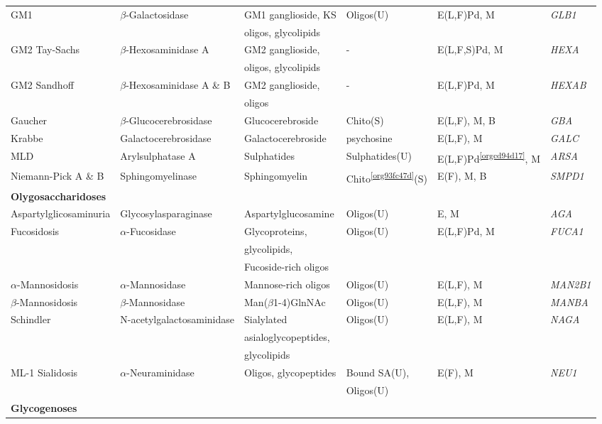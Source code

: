 \documentclass[landscape]{article}
\begin{document}
\begin{longtable}{llllll}
GM1 & \(\beta\)-Galactosidase & GM1 ganglioside, KS & Oligos(U) & E(L,F)Pd, M & \emph{GLB1}\\
 &  & oligos, glycolipids &  &  & \\
GM2 Tay-Sachs & \(\beta\)-Hexosaminidase A & GM2 ganglioside, & - & E(L,F,S)Pd, M & \emph{HEXA}\\
 &  & oligos, glycolipids &  &  & \\
GM2 Sandhoff & \(\beta\)-Hexosaminidase A \& B & GM2 ganglioside, & - & E(L,F)Pd, M & \emph{HEXAB}\\
 &  & oligos &  &  & \\
Gaucher & \(\beta\)-Glucocerebrosidase & Glucocerebroside & Chito\footnotemark(S) & E(L,F), M, B & \emph{GBA}\\
Krabbe & Galactocerebrosidase & Galactocerebroside & psychosine & E(L,F), M & \emph{GALC}\\
MLD & Arylsulphatase A & Sulphatides & Sulphatides(U) & E(L,F)Pd\textsuperscript{\ref{orgcd94d17}}, M & \emph{ARSA}\\
Niemann-Pick A \& B & Sphingomyelinase & Sphingomyelin & Chito\textsuperscript{\ref{org93fc47d}}(S) & E(F), M, B & \emph{SMPD1}\\
\hline
\textbf{Olygosaccharidoses} &  &  &  &  & \\
Aspartylglicosaminuria & Glycosylasparaginase & Aspartylglucosamine & Oligos(U) & E, M & \emph{AGA}\\
Fucosidosis & \(\alpha\)-Fucosidase & Glycoproteins, & Oligos(U) & E(L,F)Pd, M & \emph{FUCA1}\\
 &  & glycolipids, &  &  & \\
 &  & Fucoside-rich oligos &  &  & \\
\(\alpha\)-Mannosidosis & \(\alpha\)-Mannosidase & Mannose-rich oligos & Oligos(U) & E(L,F), M & \emph{MAN2B1}\\
\(\beta\)-Mannosidosis & \(\beta\)-Mannosidase & Man(\(\beta\)1-4)GlnNAc & Oligos(U) & E(L,F), M & \emph{MANBA}\\
Schindler & N-acetylgalactosaminidase & Sialylated & Oligos(U) & E(L,F), M & \emph{NAGA}\\
 &  & asialoglycopeptides, &  &  & \\
 &  & glycolipids &  &  & \\
ML-1 Sialidosis & \(\alpha\)-Neuraminidase & Oligos, glycopeptides & Bound SA(U), & E(F), M & \emph{NEU1}\\
 &  &  & Oligos(U) &  & \\
\hline
\textbf{Glycogenoses} &  &  &  &  & \\

\end{longtable}
\end{document}
